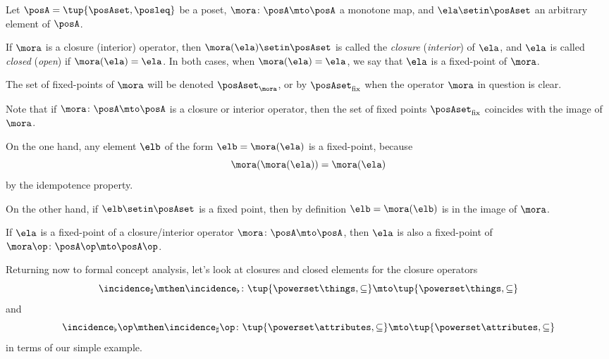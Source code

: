 \begin{definition}\label{def:closure-closed-elements}
Let $\posA = \tup{\posAset, \posleq}$ be a poset, $\mora \colon \posA \mto \posA$ a monotone map, and $\ela \setin \posAset$ an arbitrary element of $\posA$.

If $\mora$ is a closure (interior) operator, then $\mora(\ela) \setin \posAset$ is called the \emph{closure} (\emph{interior}) of $\ela$, and $\ela$ is called \emph{closed} (\emph{open}) if $\mora(\ela) = \ela$. In both cases, when $\mora(\ela) = \ela$, we say that $\ela$ is a fixed-point of $\mora$. 

The set of fixed-points of $\mora$ will be denoted $\posAset_\mora$, or by $\posAset_{\text{fix}}$ when the operator $\mora$ in question is clear. 
\end{definition}

\begin{remark}\label{rem:closed-elements-are-image}
Note that if $\mora \colon \posA \mto \posA$ is a closure or interior operator, then the set of fixed points $\posAset_{\text{fix}}$ coincides with the image of $\mora$.  

On the one hand, any element $\elb$ of the form $\elb = \mora(\ela)$ is a fixed-point, because
\begin{equation}
\mora(\mora(\ela)) = \mora(\ela)
\end{equation}
by the idempotence property. 

On the other hand, if $\elb \setin \posAset$ is a fixed point, then by definition $\elb = \mora(\elb)$ is in the image of $\mora$.
\end{remark}

\begin{remark}\label{rem:fixed-points-coincide-closure-or-interior}
If $\ela$ is a fixed-point of a closure/interior operator $\mora \colon \posA \mto \posA$, then $\ela$ is also a fixed-point of $\mora\op \colon \posA\op \mto \posA\op$. 
\end{remark}


Returning now to formal concept analysis, let's look at closures and closed elements for the closure operators 
$$\incidence_\sharp \mthen \incidence_\flat \colon \tup{\powerset \things, \subseteq} \mto \tup{\powerset \things, \subseteq}$$  
and 
$$\incidence_\flat\op \mthen \incidence_\sharp\op \colon \tup{\powerset \attributes, \subseteq} \mto \tup{\powerset \attributes, \subseteq} $$ 
in terms of our simple example. 

